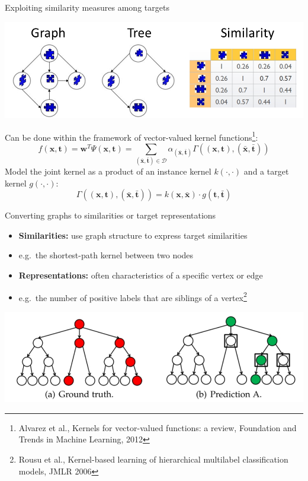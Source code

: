\documentclass[]{beamer}
\renewcommand{\vec}[1]{\boldsymbol{#1}}
\begin{document}
\begin{frame}{Exploiting similarity measures among targets}

\begin{center}
\includegraphics[scale=0.3,trim = 600 0 0 90,clip]{pics/targetrelations}
\end{center} 
Can be done within the framework of vector-valued kernel functions\footnote{Alvarez et al., Kernels for vector-valued functions: a review, Foundation and Trends in Machine Learning, 2012}:
\begin{equation*}
\label{eq:pairwise}
f(\vec{x},\vec{t}) = \vec{w}^T \Psi(\vec{x},\vec{t}) = \sum_{(\bar{\vec{x}},\bar{\vec{t}}) \in \mathcal{D}} \alpha_{(\bar{\vec{x}},\bar{\vec{t}})} \Gamma((\vec{x},\vec{t}),(\bar{\vec{x}},\bar{\vec{t}})) 
\end{equation*}
Model the joint kernel as a product of an instance kernel $k(\cdot,\cdot)$ and a target kernel $g(\cdot,\cdot)$: 
$$\Gamma((\vec{x},\vec{t}),(\bar{\vec{x}},\bar{\vec{t}})) = k(\vec{x},\bar{\vec{x}}) \cdot g(\vec{t},\bar{\vec{t}})$$

\end{frame}

\begin{frame}{Converting graphs to similarities or target representations}

\begin{itemize}
\item {\bf Similarities:} use graph structure to express target similarities
\item[] e.g.\ the shortest-path kernel between two nodes
\item {\bf Representations:}  often characteristics of a specific vertex or edge
\item[] e.g.\ the number of positive labels that are siblings of a vertex\footnote{Rousu et al., Kernel-based learning of hierarchical
multilabel classification models, JMLR 2006} 
\end{itemize}
\begin{center}
\includegraphics[scale=0.4,trim = 0 50 430 0,clip]{Figures/hloss}
\end{center}
\end{frame}
\end{document}
